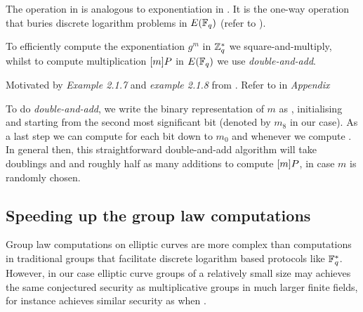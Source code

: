 
The operation in  is analogous to exponentiation   in . It is the one-way operation that buries discrete logarithm problems in $E(\mathbb{F}_q)$ (refer to ). 

 To efficiently compute the exponentiation $g^m$ in $\mathbb{Z}^{*}_{q}$ we square-and-multiply, whilst to compute multiplication $[m]{P}$ in $E(\mathbb{F}_q)$ we use \textit{double-and-add}.

\begin{example}
	Motivated by \textit{Example 2.1.7} and \textit{example 2.1.8} from \cite{theory.pairings.for.beginners}. Refer to  in \textit{Appendix }
	\label{example:doubleandaddbinaryrepresentation}
\end{example}

To do \textit{double-and-add}, we write the binary representation of $m$ as , initialising  and starting from the second most significant bit (denoted by $m_8$ in our case).  As a last step we can compute  for each bit down to $m_0$ and whenever  we compute . In general then, this straightforward double-and-add algorithm will take  doublings and and roughly half as many additions to compute $[m] {P}$, in case $m$ is randomly chosen.

\subsection{Speeding up the group law computations}
\label{ssec:ch2.speedupgrouplawcomputations}

Group law computations on elliptic curves are more complex than computations in traditional groups that facilitate discrete logarithm based protocols like $\mathbb{F}_q^*$. 
However, in our case elliptic curve groups of a relatively small size may achieves the same conjectured security as multiplicative groups in much larger finite fields, for instance  achieves similar security as  when .  


